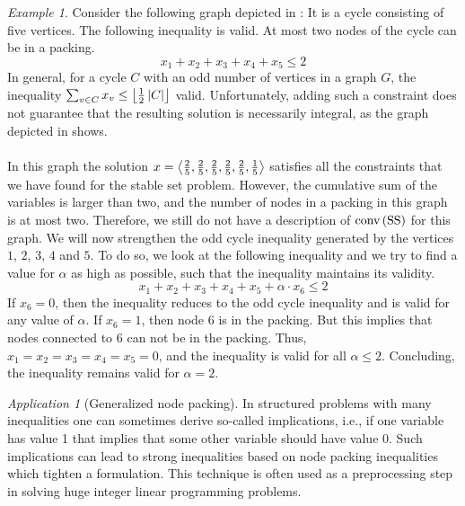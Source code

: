 \documentclass[titlepage]{book}
\theoremstyle{plain}
\theoremstyle{definition}
\theoremstyle{remark}
\newtheorem{example}{Example}
\newtheorem{application}{Application}
\begin{document}
\begin{example}
Consider the following graph depicted in : It is a cycle consisting of five vertices. The following inequality is valid. At most two nodes of the cycle can be in a packing.
\begin{equation}
x_1+x_2+x_3+x_4+x_5\leq 2
\end{equation}
In general, for a cycle $C$ with an odd number of vertices in a graph $G$, the inequality $\isumdomain[v]{C}{x_v\leq\floor{\tfrac{1}{2}\abs{C}}}$ valid. Unfortunately, adding such a constraint does not guarantee that the resulting solution is necessarily integral, as the graph depicted in  shows.



\paragraph{}
In this graph the solution $x=\tupl{\tfrac{2}{5},\tfrac{2}{5},\tfrac{2}{5},\tfrac{2}{5},\tfrac{2}{5},\tfrac{1}{5}}$ satisfies all the constraints that we have found for the stable set problem. However, the cumulative sum of the variables is larger than two, and the number of nodes in a packing in this graph is at most two. Therefore, we still do not have a description of $\funm{conv}{\mbox{SS}}$ for this graph. We will now strengthen the odd cycle inequality generated by the vertices $1$, $2$, $3$, $4$ and $5$. To do so, we look at the following inequality and we try to find a value for $\alpha$ as high as possible, such that the inequality maintains its validity.
\begin{equation}
x_1+x_2+x_3+x_4+x_5+\alpha\cdot x_6\leq 2
\end{equation}
If $x_6=0$, then the inequality reduces to the odd cycle inequality and is valid for any value of $\alpha$. If $x_6=1$, then node $6$ is in the packing. But this implies that nodes connected to $6$ can not be in the packing. Thus, $x_1=x_2=x_3=x_4=x_5=0$, and the inequality is valid for all $\alpha\leq 2$. Concluding, the inequality remains valid for $\alpha=2$.
\end{example}
\begin{application}[Generalized node packing]
In structured problems with many inequalities one can sometimes derive so-called implications, i.e., if one variable has value 1 that implies that some other variable should have value 0. Such implications can lead to strong inequalities based on node packing inequalities which tighten a formulation. This technique is often used as a preprocessing step in solving huge integer linear programming problems.
\end{application}
\end{document}
